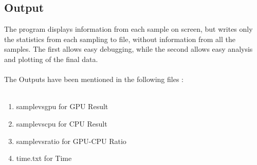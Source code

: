 \subsection{Output}
The program displays information from each sample on screen, but writes only the statistics from each sampling to file, without information from all the samples. The first allows easy debugging, while the second allows easy analysis and plotting of the final data.\\\\
The Outputs have been mentioned in the following files :\\\\
\begin{enumerate}
\item samplevsgpu for GPU Result
\item samplevscpu for CPU Result
\item samplevsratio for GPU-CPU Ratio
\item time.txt for Time
\end{enumerate}

